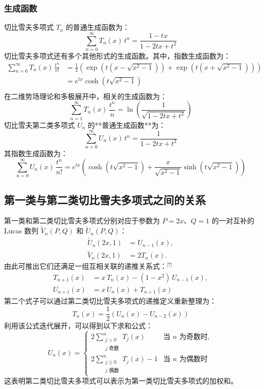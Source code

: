 \subsubsection{生成函数}
切比雪夫多项式 $T_n$ 的普通生成函数为：
$$
\sum_{n=0}^{\infty} T_n(x)\, t^n = \frac{1 - t x}{1 - 2 t x + t^2}~
$$
切比雪夫多项式还有多个其他形式的生成函数。其中，指数生成函数为：
$$
\begin{aligned}
\sum_{n=0}^{\infty} T_n(x)\, \frac{t^n}{n!}
&= \frac{1}{2} \left( \exp\left(t \left(x - \sqrt{x^2 - 1} \right)\right)+ \exp\left(t \left(x + \sqrt{x^2 - 1} \right)\right) \right)\\
&= e^{t x} \cosh\left(t \sqrt{x^2 - 1}\right)\\
\end{aligned}~
$$
在二维势场理论和多极展开中，相关的生成函数为：
$$
\sum_{n=1}^{\infty} T_n(x)\, \frac{t^n}{n}
= \ln \left( \frac{1}{\sqrt{1 - 2 t x + t^2}} \right)~
$$
切比雪夫第二类多项式 $U_n$ 的**普通生成函数**为：
$$
\sum_{n=0}^{\infty} U_n(x)\, t^n = \frac{1}{1 - 2 t x + t^2}~
$$
其指数生成函数为：
$$
\sum_{n=0}^{\infty} U_n(x)\, \frac{t^n}{n!}
= e^{t x} \left( \cosh\left(t \sqrt{x^2 - 1}\right)
+ \frac{x}{\sqrt{x^2 - 1}} \sinh\left(t \sqrt{x^2 - 1}\right) \right)~
$$
\subsection{第一类与第二类切比雪夫多项式之间的关系}
第一类和第二类切比雪夫多项式分别对应于参数为 $P = 2x$、$Q = 1$ 的一对互补的 Lucas 数列 $\tilde{V}_n(P, Q)$ 和 $\tilde{U}_n(P, Q)$：
$$
\begin{aligned}
\tilde{U}_n(2x, 1) &= U_{n-1}(x), \\
\tilde{V}_n(2x, 1) &= 2 T_n(x).
\end{aligned}~
$$
由此可推出它们还满足一组互相关联的递推关系式：\(^\text{[7]}\)
$$
\begin{aligned}
T_{n+1}(x) &= x\, T_n(x) - (1 - x^2)\, U_{n-1}(x), \\
U_{n+1}(x) &= x\, U_n(x) + T_{n+1}(x)
\end{aligned}~
$$
第二个式子可以通过第二类切比雪夫多项式的递推定义重新整理为：
$$
T_n(x) = \frac{1}{2} \left( U_n(x) - U_{n-2}(x) \right)~
$$
利用该公式迭代展开，可以得到以下求和公式：
$$
U_n(x) = 
\begin{cases}
2 \sum\limits_{\substack{j > 0 \\ j \text{ 奇数}}}^{n} T_j(x) & \text{当 } n \text{ 为奇数时}, \\
2 \sum\limits_{\substack{j \geq 0 \\ j \text{ 偶数}}}^{n} T_j(x) - 1 & \text{当 } n \text{ 为偶数时}
\end{cases}~
$$
这表明第二类切比雪夫多项式可以表示为第一类切比雪夫多项式的加权和。

